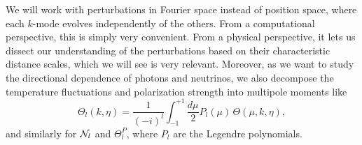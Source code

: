 \documentclass[10pt,a4paper]{article}
\begin{document}
We will work with perturbations in Fourier space instead of position space,
where each $k$-mode evolves independently of the others.
From a computational perspective,
this is simply very convenient.
From a physical perspective,
it lets us dissect our understanding of the perturbations based on their characteristic distance scales,
which we will see is very relevant.
Moreover, as we want to study the directional dependence of photons and neutrinos,
we also decompose the temperature fluctuations and polarization strength into multipole moments like
\begin{equation}
	\Theta_l(k,\eta) = \frac{1}{(-i)^l} \int_{-1}^{+1} \frac{d\mu}{2} P_l(\mu) \, \Theta(\mu,k,\eta),
\end{equation}
and similarly for $\mathcal{N}_l$ and $\Theta^P_l$,
where $P_l$ are the Legendre polynomials.
\end{document}

